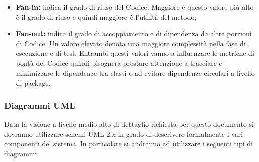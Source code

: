 \begin{itemize}
\begin{itemize}
     \item \textbf{Fan-in:} indica il grado di riuso del Codice. Maggiore è questo valore più alto è il grado di riuso e quindi maggiore è l’utilità del metodo;
     \item \textbf{Fan-out:} indica il grado di accoppiamento e di dipendenza da altre porzioni di Codice. Un valore elevato denota una maggiore complessità nella fase di esecuzione e di test.
     Entrambi questi valori vanno a influenzare le metriche di bontà del Codice quindi bisognerà prestare attenzione a tracciare e minimizzare le dipendenze tra classi e ad evitare dipendenze circolari a livello di package.
     \end{itemize}
     \end{itemize}
		\subsubsection{Diagrammi UML}
		Data la visione a livello medio-alto di dettaglio richiesta per questo documento si dovranno utilizzare schemi UML 2.x in grado di descrivere formalmente i vari componenti del sistema. In particolare si andranno ad utilizzare i seguenti tipi di diagrammi:
